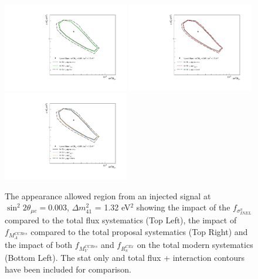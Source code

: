 \begin{figure}[h!]
  {\includegraphics[width=0.49\textwidth]{figures-chap6/allowed_regions/single_param/nue_app_flux.pdf}}
  {\includegraphics[width=0.49\textwidth]{figures-chap6/allowed_regions/single_param/nue_app_proposal.pdf}}
  {\includegraphics[width=0.49\textwidth]{figures-chap6/allowed_regions/single_param/nue_app_modern.pdf}}
  \captionsetup{width=0.49\textwidth}
  \parbox[b]{0.49\textwidth}%
  {
    \caption[The \nue appearance allowed regions with the inclusion of single systematic parameters compared to the region with the inclusion of all parameters in the associated set.]{The \nue appearance allowed region from an injected signal at $\sin^2{2\theta_{\mu e}} = 0.003$, $\Delta m^2_{41}$ = 1.32 eV$^2$ showing the impact of the $f_{\sigma^{\pi}_{INEL}}$ compared to the total flux systematics (Top Left), the impact of $f_{M_A^{CCRes}}$ compared to the total proposal systematics (Top Right) and the impact of both $f_{M_V^{CCRes}}$ and $f_{R_{\pi}^{C Ex}}$ on the total modern systematics (Bottom Left). The stat only and total flux + interaction contours have been included for comparison. \\}
    \label{fig:nue_app_single_syst_sets} 
  }
\end{figure}


